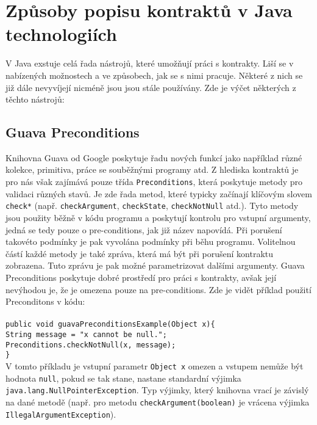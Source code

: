 	
	\section{Způsoby popisu kontraktů v Java technologiích}
		V Java exstuje celá řada nástrojů, které umožňují práci s kontrakty. Liší se v nabízených možnostech a ve způsobech, jak se s nimi pracuje. Některé z nich se již dále nevyvíjejí nicméně jsou jsou stále používány. Zde je výčet některých z těchto nástrojů:		
	
		\subsection{Guava Preconditions}
			Knihovna Guava od Google poskytuje řadu nových funkcí jako například různé kolekce, primitiva, práce se souběžnými programy atd. Z hlediska kontraktů je pro nás však zajímává pouze třída \texttt{Preconditions}, která poskytuje metody pro validaci různých stavů. Je zde řada metod, které typicky začínají klíčovým slovem \texttt{check*} (např. \texttt{checkArgument}, \texttt{checkState}, \texttt{checkNotNull} atd.). Tyto metody jsou použity běžně v kódu programu a poskytují kontrolu pro vstupní argumenty, jedná se tedy pouze o pre-conditions, jak již název napovídá. Při porušení takovéto podmínky je pak vyvolána podmínky při běhu programu. Volitelnou částí každé metody je také zpráva, která má být při porušení kontraktu zobrazena. Tuto zprávu je pak možné parametrizovat dalšími argumenty. Guava Preconditions poskytuje dobré prostředí pro práci s kontrakty, avšak její nevýhodou je, že je omezena pouze na pre-conditions. Zde je vidět příklad použití Preconditons v kódu:\\\\
			\- \- \- \- \- \texttt{public void guavaPreconditionsExample(Object x)\{}\\
			\- \- \- \- \- \- \- \- \- \- \texttt{String message = "x cannot be null.";}\\ 
        	\- \- \- \- \- \- \- \- \- \- \texttt{Preconditions.checkNotNull(x, message);}\\
    		\- \- \- \- \- \texttt{\}}\\
    		
    		V tomto příkladu je vstupní parametr \texttt{Object x} omezen a vstupem nemůže být hodnota \texttt{null}, pokud se tak stane, nastane standardní výjimka \texttt{java.lang.NullPointerException}. Typ výjimky, který knihovna vrací je závislý na dané metodě (např. pro metodu \texttt{checkArgument(boolean)} je vrácena výjimka \texttt{IllegalArgumentException}).
		
